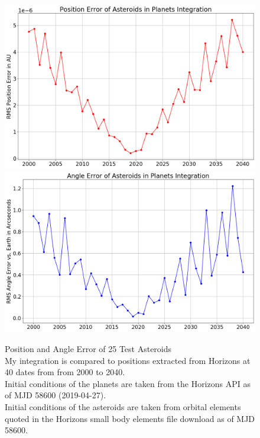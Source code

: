 \begin{figure}[hbt!]
\begin{center}
\includegraphics[width=1.0\textwidth]{../figs/integration_test/asteroids/sim_error_planets_asteroids_pos.png}
\includegraphics[width=1.0\textwidth]{../figs/integration_test/asteroids/sim_error_planets_asteroids_angle.png}
\end{center}
\caption[Position and Angle Error of 25 Test Asteroids]
{Position and Angle Error of 25 Test Asteroids\\
My integration is compared to positions extracted from Horizons at 40 dates from from 2000 to 2040.\\
Initial conditions of the planets are taken from the Horizons API as of MJD 58600 (2019-04-27). \\
Initial conditions of the asteroids are taken from orbital elements quoted in the 
Horizons small body elements file download as of MJD 58600.}
\label{fig:IntegrationTestAsteroidsFromElements}
\end{figure}
\clearpage

